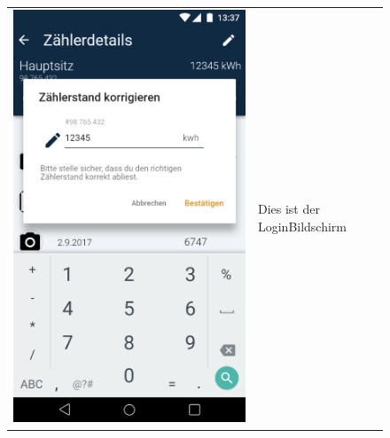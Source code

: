 \begin{figure}[h]
\begin{tabularx}{\textwidth}{X | X}
	\includegraphics[scale = 0.22]{img/AndroidMockup/correct} & Dies ist der LoginBildschirm \\ 
\end{tabularx}
\end{figure}

